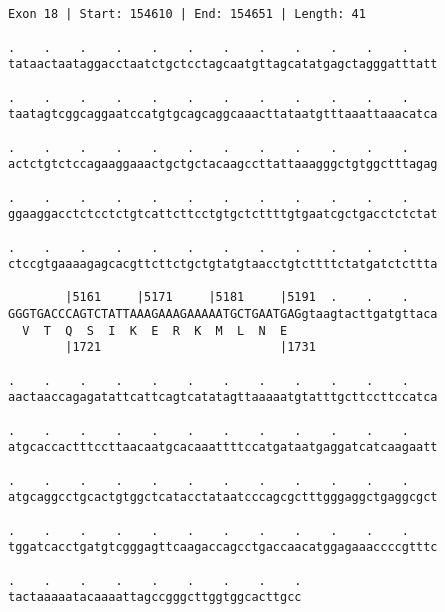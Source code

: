 \documentclass{article}
\begin{document}
\begin{Verbatim}
                  
 
Exon 18 | Start: 154610 | End: 154651 | Length: 41
 
.    .    .    .    .    .    .    .    .    .    .    .    
tataactaataggacctaatctgctcctagcaatgttagcatatgagctagggatttatt
                                                            
.    .    .    .    .    .    .    .    .    .    .    .    
taatagtcggcaggaatccatgtgcagcaggcaaacttataatgtttaaattaaacatca
                                                            
.    .    .    .    .    .    .    .    .    .    .    .    
actctgtctccagaaggaaactgctgctacaagccttattaaagggctgtggctttagag
                                                            
.    .    .    .    .    .    .    .    .    .    .    .    
ggaaggacctctcctctgtcattcttcctgtgctcttttgtgaatcgctgacctctctat
                                                            
.    .    .    .    .    .    .    .    .    .    .    .    
ctccgtgaaaagagcacgttcttctgctgtatgtaacctgtcttttctatgatctcttta
                                                            
        |5161     |5171     |5181     |5191  .    .    .    
GGGTGACCCAGTCTATTAAAGAAAGAAAAATGCTGAATGAGgtaagtacttgatgttaca
  V  T  Q  S  I  K  E  R  K  M  L  N  E                     
        |1721                         |1731                 
  
.    .    .    .    .    .    .    .    .    .    .    .    
aactaaccagagatattcattcagtcatatagttaaaaatgtatttgcttccttccatca
                                                            
.    .    .    .    .    .    .    .    .    .    .    .    
atgcaccactttccttaacaatgcacaaattttccatgataatgaggatcatcaagaatt
                                                            
.    .    .    .    .    .    .    .    .    .    .    .    
atgcaggcctgcactgtggctcatacctataatcccagcgctttgggaggctgaggcgct
                                                            
.    .    .    .    .    .    .    .    .    .    .    .    
tggatcacctgatgtcgggagttcaagaccagcctgaccaacatggagaaaccccgtttc
                                                            
.    .    .    .    .    .    .    .    .
tactaaaaatacaaaattagccgggcttggtggcacttgcc
                                         

\end{Verbatim}
\end{document}
